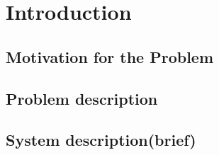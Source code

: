 \section{Introduction}
\subsection{Motivation for the Problem}
\subsection{Problem description}
\subsection{System description(brief)}